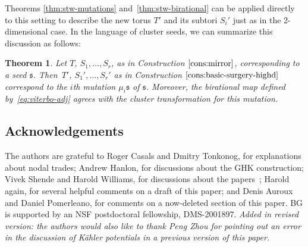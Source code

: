 \documentclass[pdftex]{sigma}%
\numberwithin{equation}{section}
\newtheorem{Theorem}{Theorem}[section]
\newcommand\frs{\mathfrak{s}}
\begin{document}
 Theorems \ref{thm:stw-mutations} and~\ref{thm:stw-birational} can be applied directly to this setting to describe the new torus $T'$ and its subtori $S_i'$ just as in the 2-dimensional case. In the language of cluster seeds, we can summarize this discussion as follows:
\begin{Theorem}
 Let $T$, $S_1,\dots,S_r$, as in Construction $\ref{cons:mirror}$, corresponding to a seed $\frs$. Then~$T'$, $S_1',\dots,S_r'$ as in Construction $\ref{cons:basic-surgery-highd}$ correspond to the $i$th mutation $\mu_i\frs$ of $\frs$. Moreover, the birational map defined by~\eqref{eq:viterbo-adj} agrees with the cluster transformation for this mutation.
\end{Theorem}


\subsection*{Acknowledgements}The authors are grateful to Roger Casals and Dmitry Tonkonog, for explanations about nodal trades; Andrew Hanlon, for discussions about the GHK construction; Vivek Shende and Harold Williams, for discussions about the papers~\cite{STW,STWZ}; Harold again, for several helpful comments on a draft of this paper; and
Denis Auroux and Daniel Pomerleano, for comments on a now-deleted section of this paper.
BG is supported by an NSF postdoctoral fellowship, DMS-2001897.
\textit{Added in revised version: the authors would also like to thank Peng Zhou for pointing out an error in the discussion of K\"ahler potentials in a previous version of this paper.}
\end{document}

